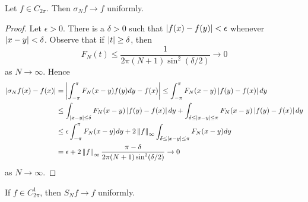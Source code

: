 \begin{theorem}[Fejer]
    Let $f\in C_{2\pi}$. Then $\sigma_Nf \to f$ uniformly.
\end{theorem}
\begin{proof}
    Let $\epsilon>0$. There is a $\delta>0$ such that $\left\lvert {f(x)-f(y)} \right\rvert<\epsilon$ 
    whenever $\left\lvert {x-y} \right\rvert<\delta$. Observe that if $\left\lvert {t} \right\rvert\geq\delta$, then 
    \begin{equation*}
        F_N(t) \leq \frac{1}{2\pi(N+1)\sin^2(\delta/2)} \to 0
    \end{equation*}
    as $N\to\infty$. Hence 
    \begin{equation*}
        \begin{split}
            \left\lvert {\sigma_Nf(x) - f(x)} \right\rvert &= \left\lvert {\int_{-\pi}^\pi F_N(x-y)f(y)dy - f(x)} \right\rvert  
            \leq \int_{-\pi}^\pi F_N(x-y)\left\lvert {f(y)-f(x)} \right\rvert dy \\
            &\leq \int_{\left\lvert {x-y} \right\rvert\leq \delta} F_N(x-y)\left\lvert {f(y)-f(x)} \right\rvert dy + \int_{\delta\leq\left\lvert {x-y} \right\rvert\leq\pi} F_N(x-y)\left\lvert {f(y)-f(x)} \right\rvert dy \\
            &\leq \epsilon\int_{-\pi}^\pi F_N(x-y)dy + 2\left\lVert {f} \right\rVert_\infty\int_{\delta\leq\left\lvert {x-y} \right\rvert\leq\pi} F_N(x-y)dy \\
            &= \epsilon + 2\left\lVert {f} \right\rVert_\infty\frac{\pi-\delta}{2\pi(N+1)\sin^2(\delta/2)} \to 0
        \end{split}
    \end{equation*}
    as $N\to\infty$.
\end{proof}

\begin{theorem}
    If $f\in C^1_{2\pi}$, then $S_Nf \to f$ uniformly.
\end{theorem}
